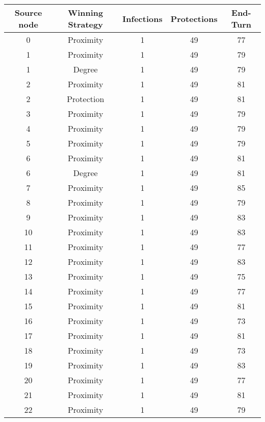 \documentclass[results.tex]{subfiles}
\begin{document}
\begin{center}
  \begin{tabular}{| c || c | c | c | c |}
    \hline
    {\bfseries Source node} & {\bfseries Winning Strategy} & {\bfseries Infections} & {\bfseries Protections} & {\bfseries End-Turn} \\  %
    \hline\hline
    0 & Proximity & 1 & 49 & 77 \\ 
    \hline
    1 & Proximity & 1 & 49 & 79 \\ 
    \hline
    1 & Degree & 1 & 49 & 79 \\ 
    \hline
    2 & Proximity & 1 & 49 & 81 \\ 
    \hline
    2 & Protection & 1 & 49 & 81 \\ 
    \hline
    3 & Proximity & 1 & 49 & 79 \\ 
    \hline
    4 & Proximity & 1 & 49 & 79 \\ 
    \hline
    5 & Proximity & 1 & 49 & 79 \\ 
    \hline
    6 & Proximity & 1 & 49 & 81 \\ 
    \hline
    6 & Degree & 1 & 49 & 81 \\ 
    \hline
    7 & Proximity & 1 & 49 & 85 \\ 
    \hline
    8 & Proximity & 1 & 49 & 79 \\ 
    \hline
    9 & Proximity & 1 & 49 & 83 \\ 
    \hline
    10 & Proximity & 1 & 49 & 83 \\ 
    \hline
    11 & Proximity & 1 & 49 & 77 \\ 
    \hline
    12 & Proximity & 1 & 49 & 83 \\ 
    \hline
    13 & Proximity & 1 & 49 & 75 \\ 
    \hline
    14 & Proximity & 1 & 49 & 77 \\ 
    \hline
    15 & Proximity & 1 & 49 & 81 \\ 
    \hline
    16 & Proximity & 1 & 49 & 73 \\ 
    \hline
    17 & Proximity & 1 & 49 & 81 \\ 
    \hline
    18 & Proximity & 1 & 49 & 73 \\ 
    \hline
    19 & Proximity & 1 & 49 & 83 \\ 
    \hline
    20 & Proximity & 1 & 49 & 77 \\ 
    \hline
    21 & Proximity & 1 & 49 & 81 \\ 
    \hline
    22 & Proximity & 1 & 49 & 79 \\ 

\end{tabular}
\end{center}
\end{document}
